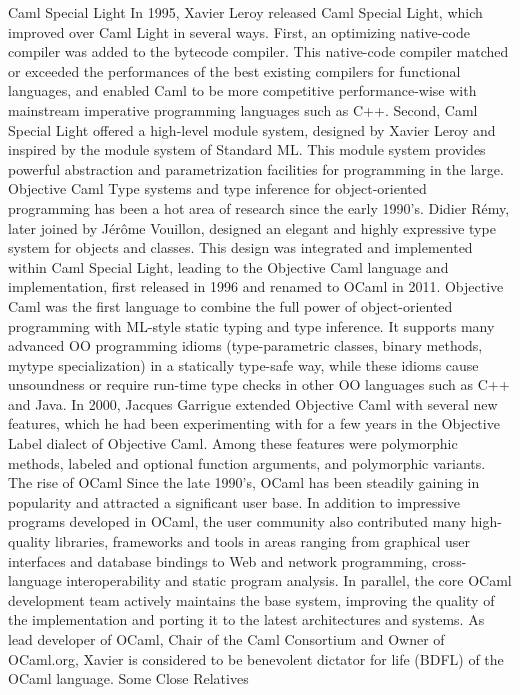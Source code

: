 \documentclass[14pt]{matmex-diploma-custom}
\begin{document}
Caml Special Light
In 1995, Xavier Leroy released Caml Special Light, which improved over Caml Light in several ways. First, an optimizing native-code compiler was added to the bytecode compiler. This native-code compiler matched or exceeded the performances of the best existing compilers for functional languages, and enabled Caml to be more competitive performance-wise with mainstream imperative programming languages such as C++. Second, Caml Special Light offered a high-level module system, designed by Xavier Leroy and inspired by the module system of Standard ML. This module system provides powerful abstraction and parametrization facilities for programming in the large.
Objective Caml
Type systems and type inference for object-oriented programming has been a hot area of research since the early 1990's. Didier Rémy, later joined by Jérôme Vouillon, designed an elegant and highly expressive type system for objects and classes. This design was integrated and implemented within Caml Special Light, leading to the Objective Caml language and implementation, first released in 1996 and renamed to OCaml in 2011. Objective Caml was the first language to combine the full power of object-oriented programming with ML-style static typing and type inference. It supports many advanced OO programming idioms (type-parametric classes, binary methods, mytype specialization) in a statically type-safe way, while these idioms cause unsoundness or require run-time type checks in other OO languages such as C++ and Java.
In 2000, Jacques Garrigue extended Objective Caml with several new features, which he had been experimenting with for a few years in the Objective Label dialect of Objective Caml. Among these features were polymorphic methods, labeled and optional function arguments, and polymorphic variants.
The rise of OCaml
Since the late 1990's, OCaml has been steadily gaining in popularity and attracted a significant user base. In addition to impressive programs developed in OCaml, the user community also contributed many high-quality libraries, frameworks and tools in areas ranging from graphical user interfaces and database bindings to Web and network programming, cross-language interoperability and static program analysis. In parallel, the core OCaml development team actively maintains the base system, improving the quality of the implementation and porting it to the latest architectures and systems. As lead developer of OCaml, Chair of the Caml Consortium and Owner of OCaml.org, Xavier is considered to be benevolent dictator for life (BDFL) of the OCaml language.
Some Close Relatives
\end{document}
